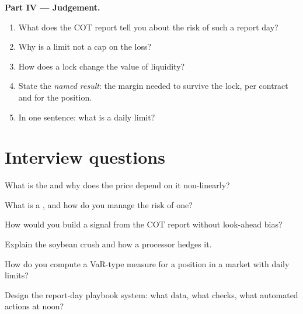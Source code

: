 \begin{problem}
\medskip\noindent\textbf{Part IV --- Judgement.}
\begin{enumerate}[resume]
\item What does the COT report tell you about the risk of such a report day?
\item Why is a limit not a cap on the loss?
\item How does a lock change the value of liquidity?
\item State the \emph{named result}: the margin needed to survive the lock, per contract and for the position.
\item In one sentence: what is a daily limit?
\end{enumerate}
\end{problem}

\section{Interview questions}

\begin{interviewq}\label{iq:m3:agriculturals-and-softs:1}
What is the  and why does the price depend on it non-linearly?
\end{interviewq}

\begin{interviewq}\label{iq:m3:agriculturals-and-softs:2}
What is a , and how do you manage the risk of one?
\end{interviewq}

\begin{interviewq}\label{iq:m3:agriculturals-and-softs:3}
How would you build a signal from the COT report without look-ahead bias?
\end{interviewq}

\begin{interviewq}\label{iq:m3:agriculturals-and-softs:4}
Explain the soybean crush and how a processor hedges it.
\end{interviewq}

\begin{interviewq}\label{iq:m3:agriculturals-and-softs:5}
How do you compute a VaR-type measure for a position in a market with daily limits?
\end{interviewq}

\begin{interviewq}\label{iq:m3:agriculturals-and-softs:6}
Design the report-day playbook system: what data, what checks, what automated actions at noon?
\end{interviewq}

